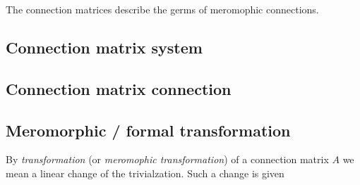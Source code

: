 \begin{cor}
  The connection matrices describe the germs of meromophic connections.
\end{cor}

\subsection{Connection matrix \leftrightarrow{} system}
\subsection{Connection matrix \rightarrow{} connection}
\begin{comment}
  There is a thm in \cite{sabbah2007isomonodromic}
\end{comment}

\subsection{Meromorphic / formal transformation}
\begin{comment}\footnotesize
  see \cite{thboalch} \textbf{Rem 1.41 on p. 16}:
  \begin{rem}
    Note that in most of the recent references we have used, Stokes matrices
    are used to classify
    \begin{itemize}
      \item meromorphic connections within fixed formal \textbf{meromorphic
        classes, modulo meromorphic equivalence}.
    \end{itemize}
    Whereas here we classify
    \begin{itemize}
      \item meromorphic connections within fixed \textbf{formal analytic
        classes, modulo analytic equivalence},
    \end{itemize}
    as is done in the older literature.  The fact is that the sets equivalence
    classes are the same in both cases. It is important for us to work with
    analytic, rather than meromorphic gauge transformations, because then the
    $\C^\infty$ viewpoint in Chapter 3 is cleaner. This distinction relates to
    the difference between \textbf{‘regular singular’} connections and
    \textbf{‘logarithmic’} connections.
  \end{rem}
\end{comment}
By \emph{transformation} (or \emph{meromophic transformation}) of a connection
matrix $A$ we mean a linear change of the trivialzation. Such a change is given
